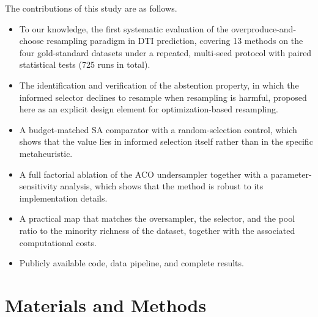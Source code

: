 \documentclass[10pt,a4paper]{article}
\begin{document}
The contributions of this study are as follows.
\begin{itemize}
  \item To our knowledge, the first systematic evaluation of the
        overproduce-and-choose resampling paradigm in DTI prediction,
        covering 13 methods on the four gold-standard datasets under a
        repeated, multi-seed protocol with paired statistical tests
        (725 runs in total).
  \item The identification and verification of the abstention property,
        in which the informed selector declines to resample when
        resampling is harmful, proposed here as an explicit design
        element for optimization-based resampling.
  \item A budget-matched SA comparator with a random-selection control,
        which shows that the value lies in informed selection itself
        rather than in the specific metaheuristic.
  \item A full factorial ablation of the ACO undersampler together with
        a parameter-sensitivity analysis, which shows that the method is
        robust to its implementation details.
  \item A practical map that matches the oversampler, the selector, and
        the pool ratio to the minority richness of the dataset, together
        with the associated computational costs.
  \item Publicly available code, data pipeline, and complete results.
\end{itemize}

\section{Materials and Methods}
\end{document}
